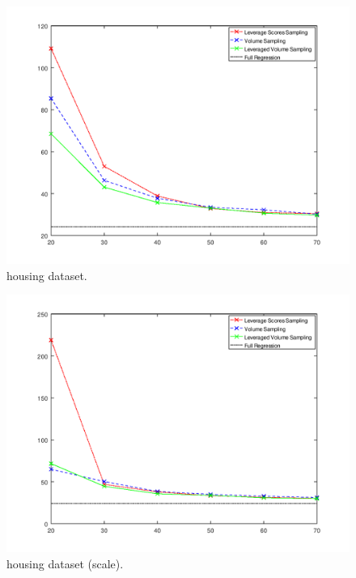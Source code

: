 \documentclass{article}
\begin{document}
        \begin{figure}
            \includegraphics[width=\linewidth]{results/housing.png}
            \caption{housing dataset.}
            \label{fig:dataset1}
        \end{figure}
        \begin{figure}
            \includegraphics[width=\linewidth]{results/housing_scale.png}
            \caption{housing dataset (scale).}
            \label{fig:dataset1}
        \end{figure}
\end{document}

